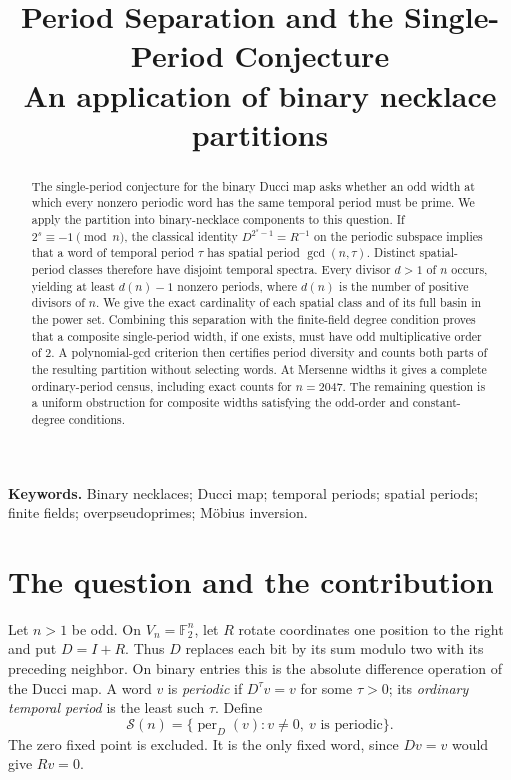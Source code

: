 \documentclass[11pt]{article}
\title{Period Separation and the Single-Period Conjecture\\[.35em]
\large An application of binary necklace partitions}
\author{}
\date{}
\theoremstyle{definition}
\theoremstyle{remark}
\numberwithin{equation}{section}
\newcommand{\F}{\mathbb F_2}
\newcommand{\Spec}{\mathcal S}
\begin{document}
\maketitle
\vspace{-2.5em}
\begin{abstract}
The single-period conjecture for the binary Ducci map asks whether an odd
width at which every nonzero periodic word has the same temporal period
must be prime. We apply the partition into binary-necklace components to
this question. If $2^s\equiv-1\pmod n$, the classical identity
$D^{2^s-1}=R^{-1}$ on the periodic subspace implies that a word of temporal
period $\tau$ has spatial period $\gcd(n,\tau)$. Distinct spatial-period
classes therefore have disjoint temporal spectra. Every divisor $d>1$ of
$n$ occurs, yielding at least $d(n)-1$ nonzero periods, where $d(n)$ is
the number of positive divisors of $n$. We give the exact cardinality of
each spatial class and of its full basin in the power set. Combining this
separation with the finite-field degree condition proves that a composite
single-period width, if one exists, must have odd multiplicative order of
$2$. A polynomial-gcd criterion then certifies period diversity and counts
both parts of the resulting partition without selecting words. At Mersenne
widths it gives a complete ordinary-period census, including exact counts
for $n=2047$. The remaining question is a uniform obstruction for composite
widths satisfying the odd-order and constant-degree conditions.
\end{abstract}

\noindent\textbf{Keywords.} Binary necklaces; Ducci map; temporal periods;
spatial periods; finite fields; overpseudoprimes; M\"obius inversion.

\section{The question and the contribution}\label{sec:introduction}

Let $n>1$ be odd. On $V_n=\F^n$, let $R$ rotate coordinates one position
to the right and put $D=I+R$. Thus $D$ replaces each bit by its sum modulo
two with its preceding neighbor. On binary entries this is the absolute
difference operation of the Ducci map. A word $v$ is \emph{periodic} if
$D^\tau v=v$ for some $\tau>0$; its \emph{ordinary temporal period} is the
least such $\tau$. Define
\begin{equation}\label{eq:spectrum}
 \Spec(n)=\{\operatorname{per}_D(v):v\ne0,\ v\text{ is periodic}\}.
\end{equation}
The zero fixed point is excluded. It is the only fixed word, since
$Dv=v$ would give $Rv=0$.
\end{document}
